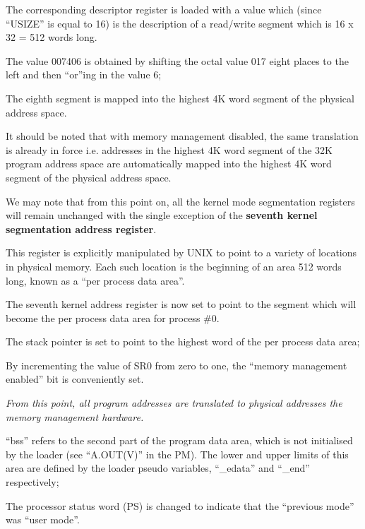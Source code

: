 \item[0634:] The corresponding descriptor
 register is loaded with a value
 which (since ``USIZE'' is equal to
 16) is the description of a
 read/write segment which is 16 x
 32 = 512 words long.

The value 007406 is obtained by
shifting the octal value 017
eight places to the left and then
``or''ing in the value 6;

\item[0641:] The eighth segment is mapped into
 the highest 4K word segment of
 the physical address space.

It should be noted that with
memory management disabled, the
same translation is already in
force i.e. addresses in the
highest 4K word segment of the
32K program address space are
automatically mapped into the
highest 4K word segment of the
physical address space.
\ed

We may note that from this point on,
all the kernel mode segmentation registers will remain unchanged with the
single exception of the {\bf seventh kernel
segmentation address register}.

This register is explicitly manipulated
by UNIX to point to a variety of
locations in physical memory. Each such
location is the beginning of an area
512 words long, known as a ``per process
data area''.

The seventh kernel address register is
now set to point to the segment which
will become the per process data area
for process \#0.

\bd
\item[0646:] The stack pointer is set to point
 to the highest word of the per
 process data area;


\item[0647:] By incrementing the value of SR0
 from zero to one, the ``memory
 management enabled'' bit is conveniently set.
\ed

{\it From this point, all program addresses
are translated to physical addresses
the memory management hardware.}

\bd
\item[0649:] ``bss'' refers to the second part
 of the program data area, which
 is not initialised by the loader
 (see ``A.OUT(V)'' in the PM). The
 lower and upper limits of this
 area are defined by the loader
 pseudo variables, ``\_edata'' and
 ``\_end'' respectively;

\item[0668:] The processor status word (PS) is
 changed to indicate that the
 ``previous mode'' was ``user mode''.

